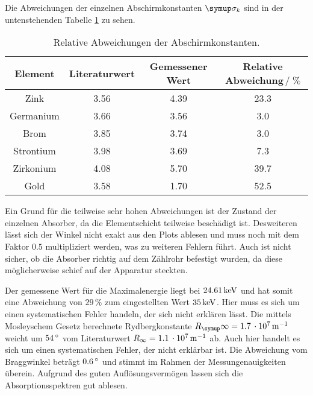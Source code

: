 
Die Abweichungen der einzelnen Abschirmkonstanten $\su{\sigma_k}$ sind in der
untenstehenden Tabelle \ref{tab:abw} zu sehen.
\begin{table}
  \centering
  \begin{tabular}{c c c c }
    \toprule
    Element & Literaturwert & Gemessener Wert & Relative Abweichung$\,/\;\%$ \\
    \midrule
    Zink       & 3.56 & 4.39 & 23.3 \\
    Germanium  & 3.66 & 3.56 &  3.0 \\
    Brom       & 3.85 & 3.74 &  3.0 \\
    Strontium  & 3.98 & 3.69 &  7.3 \\
    Zirkonium  & 4.08 & 5.70 & 39.7 \\
    Gold       & 3.58 & 1.70 & 52.5 \\
    \bottomrule
  \end{tabular}
  \caption{Relative Abweichungen der Abschirmkonstanten.}
  \label{tab:abw}
\end{table}
Ein Grund für die teilweise sehr hohen Abweichungen ist der Zustand der einzelnen
Absorber, da die Elementschicht teilweise beschädigt ist. Desweiteren lässt sich
der Winkel nicht exakt aus den Plots ablesen und muss noch mit dem Faktor $0.5$ multipliziert
werden, was zu weiteren Fehlern führt. Auch ist nicht
sicher, ob die Absorber richtig auf dem Zählrohr befestigt wurden, da diese möglicherweise
schief auf der Apparatur steckten.

Der gemessene Wert für die Maximalenergie liegt bei $24.61\,\si{\kilo\electronvolt}$ und hat somit
eine Abweichung von $29\,\%$ zum eingestellten Wert $35\,\si{\kilo\electronvolt}$. Hier muss es sich
um einen systematischen Fehler handeln, der sich nicht erklären lässt.
Die mittels Mosleyschem Gesetz berechnete Rydbergkonstante $R_\su{\infty}=1.7\,
\cdot10^7\mt^{-1}$ weicht um $54\,\si{\degree}$ vom Literaturwert $R_\infty=1.1\,\cdot10^7
\,\si{\meter}^{-1}$\cite{Ryd} ab. Auch hier handelt es sich um einen systematischen Fehler,
der nicht erklärbar ist.
Die Abweichung vom Braggwinkel beträgt $0.6\,\si{\degree}$ und stimmt im Rahmen der 
Messungenauigkeiten überein.
Aufgrund des guten Auflösungsvermögen lassen sich die Absorptionsspektren 
gut ablesen.

